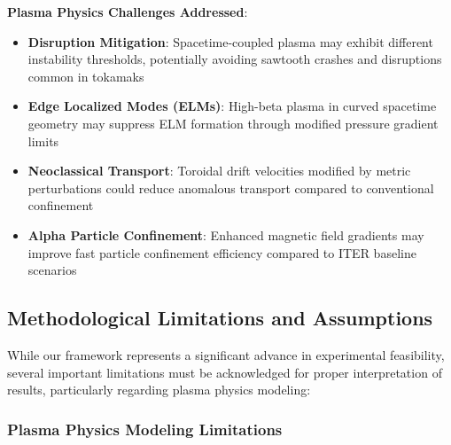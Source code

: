 \documentclass[12pt,a4paper]{article}
\begin{document}
\textbf{Plasma Physics Challenges Addressed}:
\begin{itemize}
\item \textbf{Disruption Mitigation}: Spacetime-coupled plasma may exhibit different instability thresholds, potentially avoiding sawtooth crashes and disruptions common in tokamaks
\item \textbf{Edge Localized Modes (ELMs)}: High-beta plasma in curved spacetime geometry may suppress ELM formation through modified pressure gradient limits
\item \textbf{Neoclassical Transport}: Toroidal drift velocities modified by metric perturbations could reduce anomalous transport compared to conventional confinement
\item \textbf{Alpha Particle Confinement}: Enhanced magnetic field gradients may improve fast particle confinement efficiency compared to ITER baseline scenarios
\end{itemize}

\subsection{Methodological Limitations and Assumptions}

While our framework represents a significant advance in experimental feasibility, several important limitations must be acknowledged for proper interpretation of results, particularly regarding plasma physics modeling:

\subsubsection{Plasma Physics Modeling Limitations}
\end{document}
